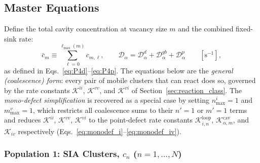 \subsection{Master Equations}
\label{sec:master_eq}

Define the total cavity concentration at vacancy size $m$ and the
combined fixed-sink rate:
\begin{equation}\label{eq:cbar}
    \bar{c}_m \equiv \sum_{\ell=0}^{\ell_{\max}(m)} c_{m,\ell},
    \qquad
    \mathcal{D}_\alpha
    = \mathcal{D}_\alpha^d + \mathcal{D}_\alpha^{gb}
    + \mathcal{D}_\alpha^p
    \qquad [\text{s}^{-1}],
\end{equation}
as defined in Eqs.~\eqref{eq:P4d}--\eqref{eq:P4p}. The equations below
are the \emph{general (coalescence) form}: every pair of mobile clusters
that can react does so, governed by the rate constants
$\mathcal{K}^{ii}$, $\mathcal{K}^{vv}$, and $\mathcal{K}^{vi}$ of
Section~\ref{sec:reaction_class}. The \emph{mono-defect simplification}
is recovered as a special case by setting $n_{\max}^i = 1$ and
$m_{\max}^v = 1$, which restricts all coalescence sums to their $n'=1$
or $m'=1$ terms and reduces $\mathcal{K}^{ii}$, $\mathcal{K}^{vv}$,
$\mathcal{K}^{vi}$ to the point-defect rate constants
$\mathcal{K}_{i,n}^{\mathrm{loop}}$,
$\mathcal{K}_{\alpha,m}^{\mathrm{cav}}$, and $\mathcal{K}_{iv}$
respectively (Eqs.~\ref{eq:monodef_i}--\ref{eq:monodef_iv}).


\subsubsection{Population 1: SIA Clusters, $c_n$\; ($n = 1,\ldots,N$)}
\label{sec:ME_SIA}

